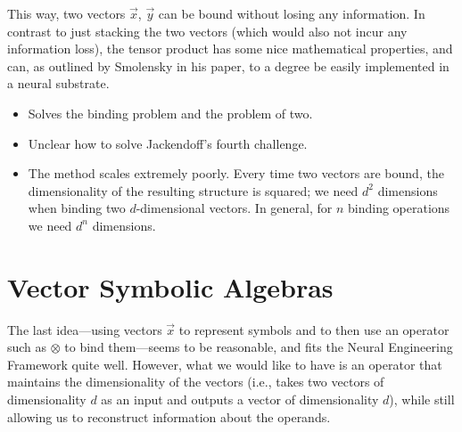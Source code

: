 \documentclass[10pt,letterpaper,oneside]{article}
\begin{document}
This way, two vectors $\vec x$, $\vec y$ can be bound without losing any information. In contrast to just stacking the two vectors (which would also not incur any information loss), the tensor product has some nice mathematical properties, and can, as outlined by Smolensky in his paper, to a degree be easily implemented in a neural substrate.
\begin{itemize}
	\item[\OPlus] Solves the binding problem and the problem of two.
	\item[\OMeh] Unclear how to solve Jackendoff's fourth challenge.
	\item[\OMinus] The method scales extremely poorly. Every time two vectors are bound, the dimensionality of the resulting structure is squared; we need $d^2$ dimensions when binding two $d$-dimensional vectors. In general, for $n$ binding operations we need $d^n$ dimensions.
\end{itemize}


\section{Vector Symbolic Algebras}

The last idea---using vectors $\vec x$ to represent symbols and to then use an operator such as $\otimes$ to bind them---seems to be reasonable, and fits the Neural Engineering Framework quite well. However, what we would like to have is an operator that maintains the dimensionality of the vectors (i.e., takes two vectors of dimensionality $d$ as an input and outputs a vector of dimensionality $d$), while still allowing us to reconstruct information about the operands.
\end{document}
